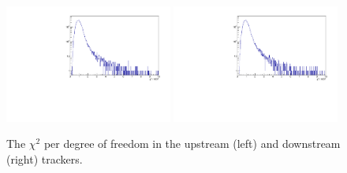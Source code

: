   
  
  \begin{figure}[p]
   \centering
    \includegraphics[width=0.49\textwidth, angle=0]{08-Performance/chi_squared_ndf_up.pdf}
    \includegraphics[width=0.49\textwidth, angle=0]{08-Performance/chi_squared_ndf_down.pdf}
   \caption{\label{fig:track_chisq} The $\chi^2$ per degree of freedom in the upstream (left) and downstream (right) trackers.}
  \end{figure}
  

